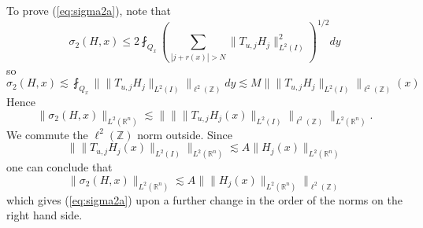 \documentclass[12pt,leqno]{amsart}
\def\R{\mathbb{R}}
\def\Z{\mathbb{Z}}
\theoremstyle{plain}
\numberwithin{equation}{section}
\begin{document}
To prove (\ref{eq:sigma2a}), note that
\[
\sigma_2(H,x) \leq 2 \fint_{Q_x} \left( \sum_{|j+r(x)|>N} \|T_{u,j} H_j\|_{L^2(I)}^2 \right)^{1/2} dy
\]
so
\[
\sigma_2(H,x)
\lesssim  \fint_{Q_x} \| \|T_{u,j} H_j\|_{L^2(I)} \|_{\ell^2(\Z)} dy
\lesssim M \| \| T_{u,j} H_j \|_{L^2(I)} \|_{\ell^2(\Z)} (x)
\]
Hence
\[
\| \sigma_2(H,x) \|_{L^2(\R^n)} \lesssim \| \| \| T_{u,j} H_j(x) \|_{L^2(I)} \|_{\ell^2(\Z)} \|_{L^2(\R^n)}.
\]
We commute the $\ell^2(\Z)$ norm outside. Since 
\begin{equation} \label{eq:problematic}
\| \| T_{u,j} H_j(x) \|_{L^2(I)} \|_{L^2(\R^n)}
\lesssim A \|H_j(x) \|_{L^2(\R^n)}
\end{equation}
one can conclude that
\[
\| \sigma_2(H,x) \|_{L^2(\R^n)}
\lesssim A \| \|H_j(x) \|_{L^2(\R^n)} \|_{\ell^2(\Z)}
\]
which gives (\ref{eq:sigma2a}) upon a further change in the order of the norms on the right hand side.
\end{document}

